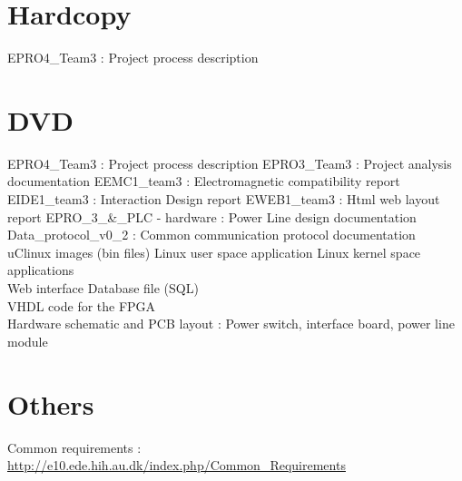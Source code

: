 \section{Hardcopy}
EPRO4\_Team3 : Project process description
\section{DVD}
EPRO4\_Team3 : Project process description
\p EPRO3\_Team3 : Project analysis documentation
\p EEMC1\_team3 : Electromagnetic compatibility report
\p EIDE1\_team3 : Interaction Design report
\p EWEB1\_team3 : Html web layout report
\p EPRO\_3\_\&\_PLC - hardware : Power Line design documentation
\p Data\_protocol\_v0\_2 : Common communication protocol documentation
\\\p uClinux images (bin files)
\p Linux user space application
\p Linux kernel space applications
\\\p Web interface
\p Database file (SQL)
\\\p VHDL code for the FPGA
\\\p Hardware schematic and PCB layout : Power switch, interface board, power line module
\section{Others}
Common requirements : \url{http://e10.ede.hih.au.dk/index.php/Common_Requirements}